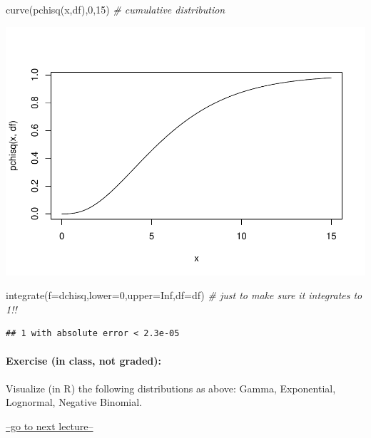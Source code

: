 \documentclass[
]{article}
\newenvironment{Shaded}{\begin{snugshade}}{\end{snugshade}}
\newcommand{\AttributeTok}[1]{\textcolor[rgb]{0.77,0.63,0.00}{#1}}
\newcommand{\CommentTok}[1]{\textcolor[rgb]{0.56,0.35,0.01}{\textit{#1}}}
\newcommand{\ConstantTok}[1]{\textcolor[rgb]{0.00,0.00,0.00}{#1}}
\newcommand{\DecValTok}[1]{\textcolor[rgb]{0.00,0.00,0.81}{#1}}
\newcommand{\FunctionTok}[1]{\textcolor[rgb]{0.00,0.00,0.00}{#1}}
\newcommand{\NormalTok}[1]{#1}
\begin{document}
\begin{Shaded}
\begin{Highlighting}[]
\FunctionTok{curve}\NormalTok{(}\FunctionTok{pchisq}\NormalTok{(x,df),}\DecValTok{0}\NormalTok{,}\DecValTok{15}\NormalTok{)   }\CommentTok{\# cumulative distribution}
\end{Highlighting}
\end{Shaded}

\includegraphics{LECTURE2_files/figure-latex/unnamed-chunk-23-2.pdf}

\begin{Shaded}
\begin{Highlighting}[]
\FunctionTok{integrate}\NormalTok{(}\AttributeTok{f=}\NormalTok{dchisq,}\AttributeTok{lower=}\DecValTok{0}\NormalTok{,}\AttributeTok{upper=}\ConstantTok{Inf}\NormalTok{,}\AttributeTok{df=}\NormalTok{df)    }\CommentTok{\# just to make sure it integrates to 1!!}
\end{Highlighting}
\end{Shaded}

\begin{verbatim}
## 1 with absolute error < 2.3e-05
\end{verbatim}

\hypertarget{exercise-in-class-not-graded}{%
\paragraph{Exercise (in class, not
graded):}\label{exercise-in-class-not-graded}}

Visualize (in R) the following distributions as above: Gamma,
Exponential, Lognormal, Negative Binomial.

\href{LECTURE3.html}{--go to next lecture--}
\end{document}
